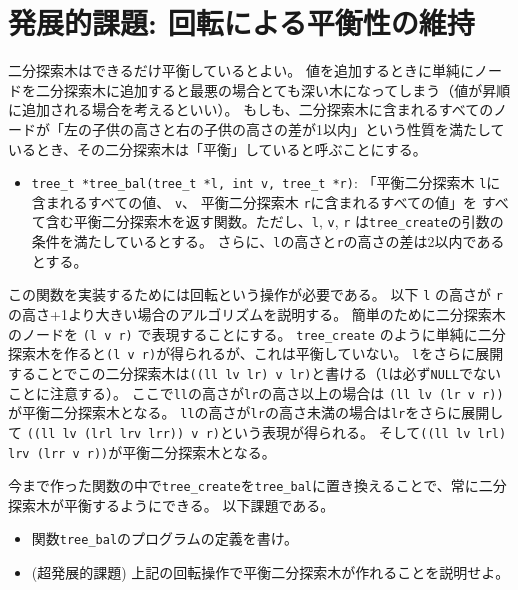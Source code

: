 \documentclass[a4paper,twoside,onecolumn,openany,article]{memoir}
\theoremstyle{remark}
\begin{document}
\section{発展的課題: 回転による平衡性の維持}
二分探索木はできるだけ平衡しているとよい。
値を追加するときに単純にノードを二分探索木に追加すると最悪の場合とても深い木になってしまう（値が昇順に追加される場合を考えるといい）。
もしも、二分探索木に含まれるすべてのノードが「左の子供の高さと右の子供の高さの差が1以内」という性質を満たしているとき、その二分探索木は「平衡」していると呼ぶことにする。
\begin{itemize}
\item \texttt{tree\_t *tree\_bal(tree\_t *l, int v, tree\_t *r)}: 「平衡二分探索木 \texttt{l}に含まれるすべての値、 \texttt{v}、 平衡二分探索木 \texttt{r}に含まれるすべての値」を
すべて含む平衡二分探索木を返す関数。ただし、\texttt{l}, \texttt{v}, \texttt{r} は\texttt{tree\_create}の引数の条件を満たしているとする。
さらに、\texttt{l}の高さと\texttt{r}の高さの差は2以内であるとする。
\end{itemize}
この関数を実装するためには回転という操作が必要である。
以下 \texttt{l} の高さが \texttt{r} の高さ+1より大きい場合のアルゴリズムを説明する。
簡単のために二分探索木のノードを \texttt{(l v r)} で表現することにする。
\texttt{tree\_create} のように単純に二分探索木を作ると\texttt{(l v r)}が得られるが、これは平衡していない。
\texttt{l}をさらに展開することでこの二分探索木は\texttt{((ll lv lr) v lr)}と書ける（\texttt{l}は必ず\texttt{NULL}でないことに注意する）。
ここで\texttt{ll}の高さが\texttt{lr}の高さ以上の場合は
\texttt{(ll lv (lr v r))}が平衡二分探索木となる。
\texttt{ll}の高さが\texttt{lr}の高さ未満の場合は\texttt{lr}をさらに展開して
\texttt{((ll lv (lrl lrv lrr)) v r)}という表現が得られる。
そして\texttt{((ll lv lrl) lrv (lrr v r))}が平衡二分探索木となる。

今まで作った関数の中で\texttt{tree\_create}を\texttt{tree\_bal}に置き換えることで、常に二分探索木が平衡するようにできる。
以下課題である。
\begin{itemize}
\item 関数\texttt{tree\_bal}のプログラムの定義を書け。
\item (超発展的課題) 上記の回転操作で平衡二分探索木が作れることを説明せよ。
\end{itemize}
\end{document}
